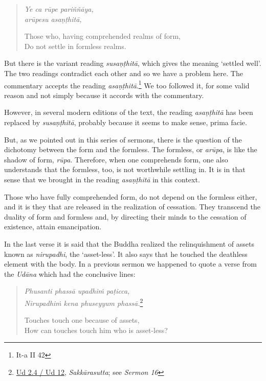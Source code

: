 \begin{quote}
\emph{Ye ca rūpe pariññāya,}\\
\emph{arūpesu asaṇṭhitā,}

Those who, having comprehended realms of form,\\
Do not settle in formless realms.
\end{quote}

But there is the variant reading \emph{susaṇṭhitā}, which gives the meaning `settled well'. The two readings contradict each other and so we have a problem here. The commentary accepts the reading \emph{asaṇṭhitā}.\footnote{It-a II 42} We too followed it, for some valid reason and not simply because it accords with the commentary.

However, in several modern editions of the text, the reading \emph{asaṇṭhitā} has been replaced by \emph{susaṇṭhitā}, probably because it seems to make sense, prima facie.

But, as we pointed out in this series of sermons, there is the question of the dichotomy between the form and the formless. The formless, or \emph{arūpa}, is like the shadow of form, \emph{rūpa}. Therefore, when one comprehends form, one also understands that the formless, too, is not worthwhile settling in. It is in that sense that we brought in the reading \emph{asaṇṭhitā} in this context.

Those who have fully comprehended form, do not depend on the formless either, and it is they that are released in the realization of cessation. They transcend the duality of form and formless and, by directing their minds to the cessation of existence, attain emancipation.

In the last verse it is said that the Buddha realized the relinquishment of assets known as \emph{nirupadhi}, the `asset-less'. It also says that he touched the deathless element with the body. In a previous sermon we happened to quote a verse from the \emph{Udāna} which had the conclusive lines:

\begin{quote}
\emph{Phusanti phassā upadhiṁ paṭicca,}\\
\emph{Nirupadhiṁ kena phuseyyum phassā.}\footnote{\href{https://suttacentral.net/ud2.4/pli/ms}{Ud 2.4 / Ud 12}, \emph{Sakkārasutta}; see \emph{Sermon 16}}

Touches touch one because of assets,\\
How can touches touch him who is asset-less?
\end{quote}

